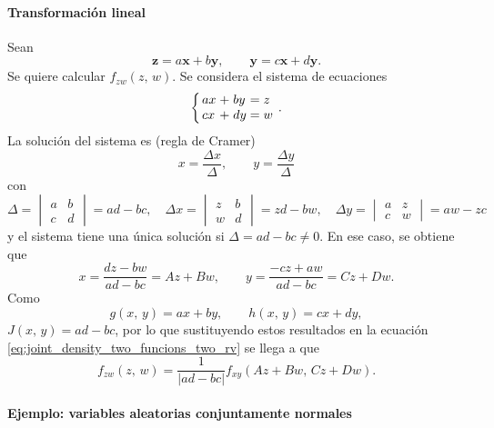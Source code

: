 \documentclass[a4paper]{report}
\newcommand{\x}{\mathbf{x}}
\newcommand{\y}{\mathbf{y}}
\newcommand{\z}{\mathbf{z}}
\begin{document}
\paragraph{Transformación lineal}
Sean
\[
 \z=a\x+b\y,\qquad \y=c\x+d\y.
\]
Se quiere calcular \(f_{zw}(z,\,w)\). Se considera el sistema de ecuaciones
\[
\arraycolsep=1.4pt
 \left\{
 \begin{array}{lllll}
  ax&+&by&=&z\\
  cx&+&dy&=&w
 \end{array} \right..
\]
La solución del sistema es (regla de Cramer)
\[
 x=\frac{\Delta x}{\Delta},\qquad y=\frac{\Delta y}{\Delta}
\]
con
\[
\Delta=
\begin{vmatrix}
  a & b \\
  c & d
\end{vmatrix}
=ad-bc,
\quad
\Delta x=
\begin{vmatrix}
  z & b \\
  w & d
\end{vmatrix}
=zd-bw,
\quad
\Delta y=
\begin{vmatrix}
  a & z \\
  c & w
\end{vmatrix}
=aw-zc
\]
y el sistema tiene una única solución si \(\Delta=ad-bc\neq0\). En ese caso, se obtiene que
\[
 x=\frac{dz-bw}{ad-bc}=Az+Bw,\qquad y=\frac{-cz+aw}{ad-bc}=Cz+Dw.
\]
Como
\[
 g(x,\,y)=ax+by,\qquad h(x,\,y)=cx+dy,
\]
\(J(x,\,y)=ad-bc\),
por lo que sustituyendo estos resultados en la ecuación \ref{eq:joint_density_two_funcions_two_rv} se llega a que
\begin{equation}\label{eq:two_rv_linear_transformation}
 f_{zw}(z,\,w)=\frac{1}{|ad-bc|}f_{xy}(Az+Bw,\,Cz+Dw).
\end{equation}

\paragraph{Ejemplo: variables aleatorias conjuntamente normales}
\end{document}
